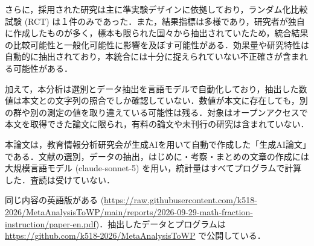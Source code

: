 \documentclass[
  lualatex, ja=standard, paper={182mm,257mm}, twocolumn, fontsize=8.5pt, baselineskip=13.5pt,
  line_length=24zw, column_gap=6.1mm, number_of_lines=45, head_space=24.5mm, gutter=16.25mm
]{jlreq}
\newcommand{\chapspaced}[1]{\par\vspace{13.5pt}\needspace{4\baselineskip}{\centering\gtfamily\bfseries #1\par}\nopagebreak}
\begin{document}
さらに，採用された研究は主に準実験デザインに依拠しており，ランダム化比較試験 (RCT) は１件のみであった．また，結果指標は多様であり，研究者が独自に作成したものが多く，標本も限られた国々から抽出されていたため，統合結果の比較可能性と一般化可能性に影響を及ぼす可能性がある．効果量や研究特性は自動的に抽出されており，本統合には十分に捉えられていない不正確さが含まれる可能性がある．

加えて，本分析は選別とデータ抽出を言語モデルで自動化しており，抽出した数値は本文との文字列の照合でしか確認していない．数値が本文に存在しても，別の群や別の測定の値を取り違えている可能性は残る．対象はオープンアクセスで本文を取得できた論文に限られ，有料の論文や未刊行の研究は含まれていない．

\chapspaced{付\hspace{1\zw}記}
本論文は，教育情報分析研究会が生成AIを用いて自動で作成した「生成AI論文」である．文献の選別，データの抽出，はじめに・考察・まとめの文章の作成には大規模言語モデル (claude-sonnet-5) を用い，統計量はすべてプログラムで計算した．査読は受けていない．

同じ内容の英語版がある (\url{https://raw.githubusercontent.com/k518-2026/MetaAnalysisToWP/main/reports/2026-09-29-math-fraction-instruction/paper-en.pdf})．抽出したデータとプログラムは \url{https://github.com/k518-2026/MetaAnalysisToWP} で公開している．
\end{document}
